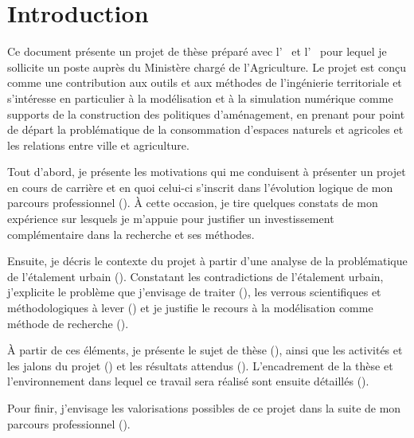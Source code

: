 \section
{Introduction}

Ce document présente un projet de thèse préparé avec l’{\UMR\ \EVS} et l’{\UMR\ \TETIS}
pour lequel je sollicite un poste {\FCPR} auprès du Ministère chargé de
l’Agriculture.
Le projet est conçu comme une contribution aux outils et aux méthodes
de l’ingénierie territoriale et s’intéresse en particulier à la modélisation
et à la simulation numérique comme supports de la construction
des politiques d'aménagement, en prenant pour point de départ
la problématique de la consommation d’espaces
naturels et agricoles et les relations entre ville et agriculture.

Tout d’abord, je présente les motivations qui me conduisent à présenter un
projet {\FCPR}  en cours de carrière et en quoi celui-ci s’inscrit dans l'évolution logique
de mon parcours professionnel (\in[origin]). À cette
occasion, je tire quelques constats de mon expérience sur lesquels
je m'appuie pour justifier un investissement complémentaire dans la recherche
et ses méthodes.

Ensuite, je décris le contexte du projet à partir d’une analyse de la
problématique de l’étalement urbain (\in[contexte]). Constatant les contradictions
de l'étalement urbain, j'explicite le problème que j'envisage de traiter (\in[probleme]),
les verrous scientifiques et méthodologiques à lever (\in[verrous]) et je justifie
le recours à la modélisation comme méthode de recherche (\in[methodo]).

À partir de ces éléments, je présente le sujet de thèse (\in[sujet]),
ainsi que les activités et les jalons du projet (\in[planning])
et les résultats attendus (\in[resultats]).
L'encadrement de la thèse et l'environnement dans lequel ce travail
sera réalisé sont ensuite détaillés (\in[environnement]).

Pour finir, j’envisage les valorisations possibles de ce projet dans la suite de mon
parcours professionnel (\in[suites]).